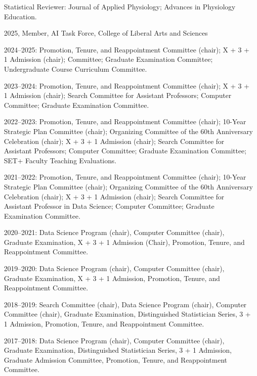 \documentclass[Statistics]{vita}
\begin{document}
\begin{vita}
\begin{Services}
\begin{JournalReviews}
  \item Statistical Reviewer:  Journal of Applied Physiology; Advances in Physiology Education.
  \end{JournalReviews}
  \begin{InstitutionalService}
  \item 2025, Member, AI Task Force, College of Liberal Arts and Sciences
  \end{InstitutionalService}
  \begin{DepartmentalService}
  \item 2024--2025: Promotion, Tenure, and Reappointment Committee (chair); X + 3 + 1 Admission (chair); Committee; Graduate Examination Committee; Undergraduate Course Curriculum Committee.
 \item 2023--2024: Promotion, Tenure, and Reappointment Committee (chair); X + 3 + 1 Admission (chair); Search Committee for Assistant Professors; Computer Committee; Graduate Examination Committee.
  \item 2022--2023: Promotion, Tenure, and Reappointment Committee (chair); 10-Year Strategic Plan Committee (chair); Organizing Committee of the 60th Anniversary Celebration (chair); X + 3 + 1 Admission (chair); Search Committee for Assistant Professors; Computer Committee; Graduate Examination Committee; SET+ Faculty Teaching Evaluations.
  \item 2021--2022: Promotion, Tenure, and Reappointment Committee (chair); 10-Year Strategic Plan Committee (chair); Organizing Committee of the 60th Anniversary Celebration (chair); X + 3 + 1 Admission (chair); Search Committee for Assistant Professor in Data Science; Computer Committee; Graduate Examination Committee. 
  \item 2020--2021: Data Science Program (chair), Computer Committee (chair), Graduate Examination,  X + 3 + 1 Admission (Chair), Promotion, Tenure, and Reappointment Committee.
  \item 2019--2020: Data Science Program (chair), Computer Committee (chair), Graduate Examination,  X + 3 + 1 Admission, Promotion, Tenure, and Reappointment Committee.
  \item 2018--2019: Search Committee (chair), Data Science Program (chair), Computer Committee (chair), Graduate Examination, Distinguished Statistician Series, 3 + 1 Admission, Promotion, Tenure, and Reappointment Committee.
  \item 2017--2018: Data Science Program (chair), Computer Committee (chair), Graduate Examination, Distinguished Statistician Series, 3 + 1 Admission, Graduate Admission Committee, Promotion, Tenure, and Reappointment Committee.

\end{DepartmentalService}
\end{Services}
\end{vita}
\end{document}
